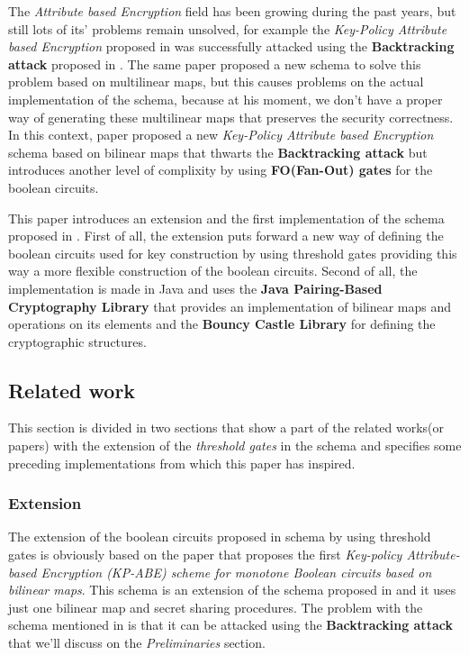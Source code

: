 \documentclass[12pt]{article}
\begin{document}
The \textit{Attribute based Encryption} field has been growing during the past years, but still lots of its' problems  remain unsolved, for example the \textit{Key-Policy Attribute based Encryption} proposed in \cite{gpsw} was successfully attacked using the \textbf{Backtracking attack} proposed in \cite{gghsw}. The same paper proposed a new schema to solve this problem based on multilinear maps, but this causes problems on the actual implementation of the schema, because at his moment, we don't have a proper way of generating these multilinear maps that preserves the security correctness. In this context, \cite{fltccd} paper proposed a new \textit{Key-Policy Attribute based Encryption} schema based on bilinear maps that thwarts the \textbf{Backtracking attack} but introduces another level of complixity by using \textbf{FO(Fan-Out) gates} for the boolean circuits. 

This paper introduces an extension and the first implementation of the schema proposed in \cite{fltccd}. First of all, the extension puts forward a new way of defining the boolean circuits used for key construction by using threshold gates providing this way a more flexible construction of the boolean circuits. Second of all, the implementation is made in Java and uses the \textbf{Java Pairing-Based Cryptography Library} that provides an implementation of bilinear maps and operations on its elements and the \textbf{Bouncy Castle Library} for defining the cryptographic structures.

\vspace{80mm}

\subsection{Related work}

This section is divided in two sections that show a part of the related works(or papers) with the extension of the \textit{threshold gates} in the \cite{fltccd} schema and specifies some preceding implementations from which this paper has inspired.  

\subsubsection{Extension}

The extension of the boolean circuits proposed in \cite{fltccd} schema by using threshold gates is obviously based on the \cite{fltccd} paper that proposes the first \textit{Key-policy Attribute-based Encryption (KP-ABE) scheme for monotone Boolean circuits based on bilinear maps}. This schema is an extension of the schema proposed in \cite{gpsw} and it uses just one bilinear map and secret sharing procedures. The problem with the schema mentioned in \cite{gpsw} is that it can be attacked using the \textbf{Backtracking attack} that we'll discuss on the \textit{Preliminaries} section. 
\end{document}
